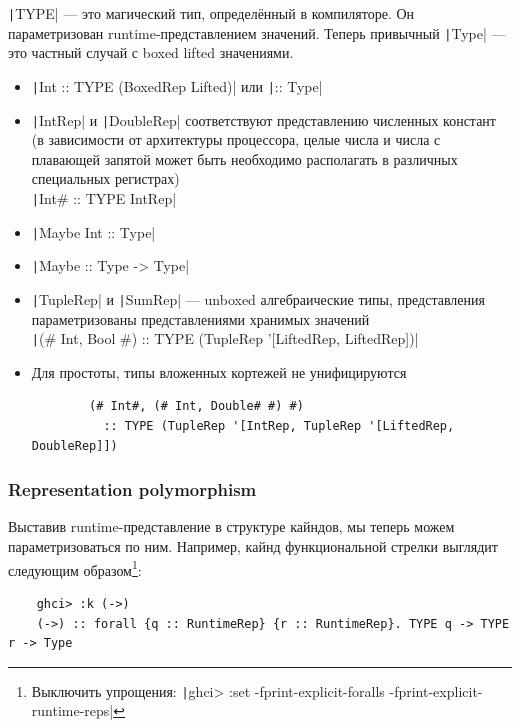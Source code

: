 \texttt|TYPE| --- это магический тип, определённый в компиляторе.
Он параметризован runtime-представлением значений.
Теперь привычный \texttt|Type| --- это частный случай с boxed lifted значениями.

\begin{itemize}
    \item \texttt|Int :: TYPE (BoxedRep Lifted)| или \texttt|:: Type|
    \item \texttt|IntRep| и \texttt|DoubleRep| соответствуют представлению численных констант (в зависимости от архитектуры процессора, целые числа и числа с плавающей запятой может быть необходимо располагать в различных специальных регистрах)\\ \texttt|Int# :: TYPE IntRep|
    \item \texttt|Maybe Int :: Type|
    \item \texttt|Maybe :: Type -> Type|
    \item \texttt|TupleRep| и \texttt|SumRep| --- unboxed алгебраические типы, представления параметризованы представлениями хранимых значений\\
    \texttt|(# Int, Bool #) :: TYPE (TupleRep '[LiftedRep, LiftedRep])|
    \item Для простоты, типы вложенных кортежей не унифицируются
    \begin{verbatim}
        (# Int#, (# Int, Double# #) #)
          :: TYPE (TupleRep '[IntRep, TupleRep '[LiftedRep, DoubleRep]])
    \end{verbatim}
\end{itemize}

\subsubsection{Representation polymorphism}

Выставив runtime-представление в структуре кайндов, мы теперь можем параметризоваться по ним.
Например, кайнд функциональной стрелки выглядит следующим образом\footnote{Выключить упрощения: \texttt|ghci> :set -fprint-explicit-foralls -fprint-explicit-runtime-reps|}:
\begin{verbatim}
    ghci> :k (->)
    (->) :: forall {q :: RuntimeRep} {r :: RuntimeRep}. TYPE q -> TYPE r -> Type
\end{verbatim}

